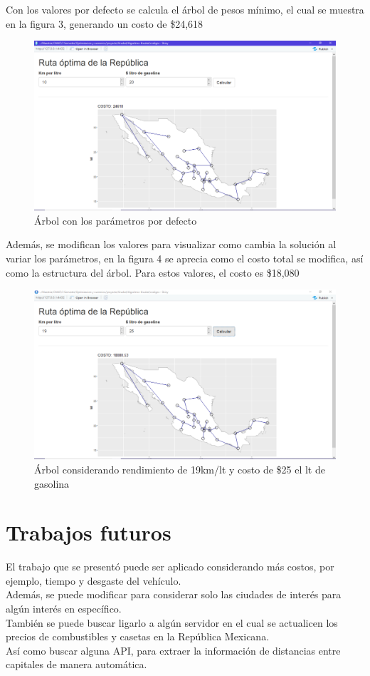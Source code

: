 \documentclass[14pt, letterpaper]{article}
\begin{document}
Con los valores por defecto se calcula el árbol de pesos mínimo, el cual se muestra en la figura 3, generando un costo de \$24,618\\

\begin{figure}
\centering
\includegraphics[scale=.45]{i3.png} 
\caption{Árbol con los parámetros por defecto}
\end{figure}

Además, se modifican los valores para visualizar como cambia la solución al variar los parámetros, en la figura 4 se aprecia como el costo total se modifica, así como la estructura del árbol. Para estos valores, el costo es \$18,080\\

\begin{figure}
\centering
\includegraphics[scale=.45]{i4.png} 
\caption{Árbol considerando rendimiento de 19km/lt y costo de \$25 el lt de gasolina}
\end{figure}


\section{Trabajos futuros}
El trabajo que se presentó puede ser aplicado considerando más costos, por ejemplo, tiempo y desgaste del vehículo.\\

Además, se puede modificar para considerar solo las ciudades de interés para algún interés en específico.\\

También se puede buscar ligarlo a algún servidor en el cual se actualicen los precios de combustibles y casetas en la República Mexicana.\\

Así como buscar alguna API, para extraer la información de distancias entre capitales de manera automática.
\end{document}
